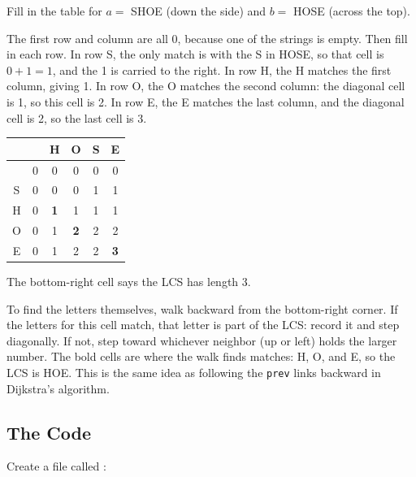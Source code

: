 \begin{Worked}
\begin{Problem}
Fill in the table for $a = $ SHOE (down the side) and $b = $ HOSE (across the top).
\end{Problem}
\begin{Solution}
The first row and column are all 0, because one of the strings is empty. Then fill in each
row. In row S, the only match is with the S in HOSE, so that cell is $0 + 1 = 1$, and the 1 is carried to
the right. In row H, the H matches the first column, giving 1. In row O, the O matches the second column:
the diagonal cell is 1, so this cell is 2. In row E, the E matches the last column, and the diagonal cell is
2, so the last cell is 3.

\begin{center}
\begin{tabular}{c|ccccc}
 & & H & O & S & E \\
\hline
 & 0 & 0 & 0 & 0 & 0 \\
S & 0 & 0 & 0 & 1 & 1 \\
H & 0 & \textbf{1} & 1 & 1 & 1 \\
O & 0 & 1 & \textbf{2} & 2 & 2 \\
E & 0 & 1 & 2 & 2 & \textbf{3} \\
\end{tabular}
\end{center}

The bottom-right cell says the LCS has length 3.
\end{Solution}
\end{Worked}

To find the letters themselves, walk backward from the bottom-right corner. If the letters for this cell
match, that letter is part of the LCS: record it and step diagonally. If not, step toward whichever neighbor
(up or left) holds the larger number. The bold cells are where the walk finds matches: H, O, and E, so the
LCS is HOE. This is the same idea as following the \verb|prev| links backward in Dijkstra's algorithm.

\subsection{The Code}
Create a file called :

